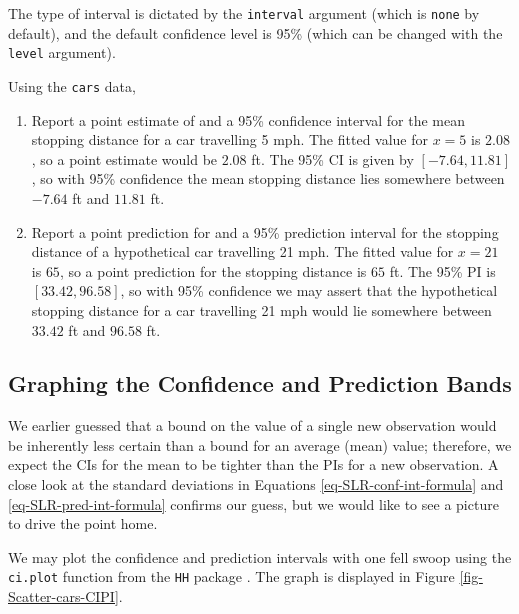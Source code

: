 \documentclass[captions=tableheading]{scrbook}
\begin{document}
The type of interval is dictated by the \texttt{interval} argument (which is \texttt{none} by default), and the default confidence level is 95\% (which can be changed with the \texttt{level} argument). 

\begin{example}
Using the \texttt{cars} data,
\begin{enumerate}
\item Report a point estimate of and a 95\% confidence interval for the mean stopping distance for a car travelling 5 mph.
   The fitted value for \(x=5\) is \(  2.08 \), so a point estimate would be \(  2.08 \) ft. The 95\% CI is given by \( [  -7.64,  11.81 ] \), so with 95\% confidence the mean stopping distance lies somewhere between \(  -7.64 \) ft and \(  11.81 \) ft.
\item Report a point prediction for and a 95\% prediction interval for the stopping distance of a hypothetical car travelling 21 mph.
   The fitted value for \(x = 21\) is \(  65 \), so a point prediction for the stopping distance is \(  65 \) ft. The 95\% PI is \( [  33.42,  96.58 ] \), so with 95\% confidence we may assert that the hypothetical stopping distance for a car travelling 21 mph would lie somewhere between \(  33.42 \) ft and \(  96.58 \) ft.
\end{enumerate}
\end{example}
\subsection{Graphing the Confidence and Prediction Bands}
\label{sec-11-2-6}


We earlier guessed that a bound on the value of a single new observation would be inherently less certain than a bound for an average (mean) value; therefore, we expect the CIs for the mean to be tighter than the PIs for a new observation. A close look at the standard deviations in Equations \ref{eq-SLR-conf-int-formula} and \ref{eq-SLR-pred-int-formula} confirms our guess, but we would like to see a picture to drive the point home.

We may plot the confidence and prediction intervals with one fell swoop using the \texttt{ci.plot} function from the \texttt{HH} package \cite{Heibergerhh}. The graph is displayed in Figure \ref{fig-Scatter-cars-CIPI}.
\end{document}
